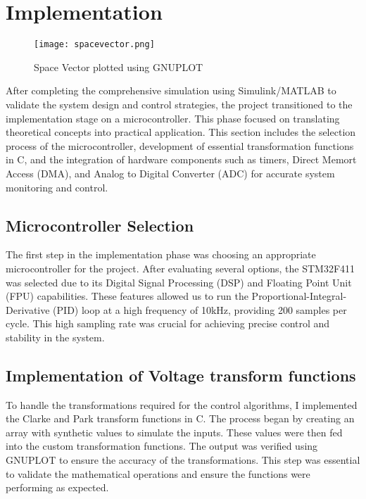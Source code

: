 \section{Implementation}
\begin{figure}[h]
    \centering
    \texttt{[image: spacevector.png]}
    \caption{Space Vector plotted using GNUPLOT}
    \label{fig:Space Vector Generated using C code}
\end{figure}
After completing the comprehensive simulation using Simulink/MATLAB to validate
the system design and control strategies, the project transitioned to the
implementation stage on a microcontroller. This phase focused on translating
theoretical concepts into practical application. This section includes the
selection process of the microcontroller, development of essential
transformation functions in C, and the integration of hardware components such
as timers, Direct Memort Access (DMA), and Analog to Digital Converter (ADC)
for accurate system monitoring and control.

\subsection{Microcontroller Selection}
The first step in the implementation phase was choosing an appropriate
microcontroller for the project. After evaluating several options, the
STM32F411 was selected due to its Digital Signal Processing (DSP) and Floating
Point Unit (FPU) capabilities. These features allowed us to run the
Proportional-Integral-Derivative (PID) loop at a high frequency of 10kHz,
providing 200 samples per cycle. This high sampling rate was crucial for
achieving precise control and stability in the system.

\subsection{Implementation of Voltage transform functions}
To handle the transformations required for the control algorithms, I
implemented the Clarke and Park transform functions in C. The process began by
creating an array with synthetic values to simulate the inputs. These values
were then fed into the custom transformation functions. The output was verified
using GNUPLOT to ensure the accuracy of the transformations. This step was
essential to validate the mathematical operations and ensure the functions were
performing as expected.

